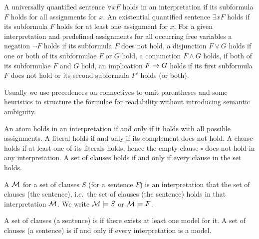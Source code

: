 \begin{definition}
	\label{def:semantics:FOF}
	A universally quantified sentence \( \forall x F \)
	holds in an interpretation if its subformula \( F \) holds for all assignments for \( x \).
	An existential quantified sentence \( \exists xF \) holds if its subformula \( F \) holds for at least one assignment for \( x \).
	For a given interpretation and predefined assignments for all occurring free variables
	a negation \( \lnot F \) holds if its subformula \( F \) does not hold,
	a disjunction \( F\lor G \) holds if one or both of its subformulae \( F \) or \( G \) hold,
	a conjunction \( F\land G \) holds, if both of its subformulae \( F \) and \( G \) hold,
	an implication \( F\rightarrow G \) holds if its first subformula \( F \) does not hold or its second subformula \( F' \) holds (or both).

	\begin{remark}Usually we use precedences on connectives to omit parentheses
		and some heuristics to structure the formulae for readability
		without introducing semantic ambiguity.
	\end{remark}
\end{definition}

\begin{definition}\label{def:semantics:CNF}
	An atom holds in an interpretation if and only if it
	holds with all possible assignments.
	A literal holds if and only if its complement does not hold.
	A clause holds if at least one of its literals holds,
	hence the empty clause \( \square \) does not hold in any interpretation.
	A set of clauses holds if and only if every clause in the set holds.
\end{definition}

\begin{definition}
	A  \( \mathcal{M} \) for a set of clauses \( S \) (for a sentence \( F \))
	is an interpretation that
	 the set of clauses (the sentence),
	i.e.~the set of clauses (the sentence) holds in that interpretation \( \mathcal{M} \).
	We write \( \mathcal{M}\models S \) or \( \mathcal{M}\models F \).

	A set of clauses (a sentence) is  if there exists at least one model for it.
	A set of clauses (a sentence) is  if and only if every interpretation is a model.
\end{definition}

